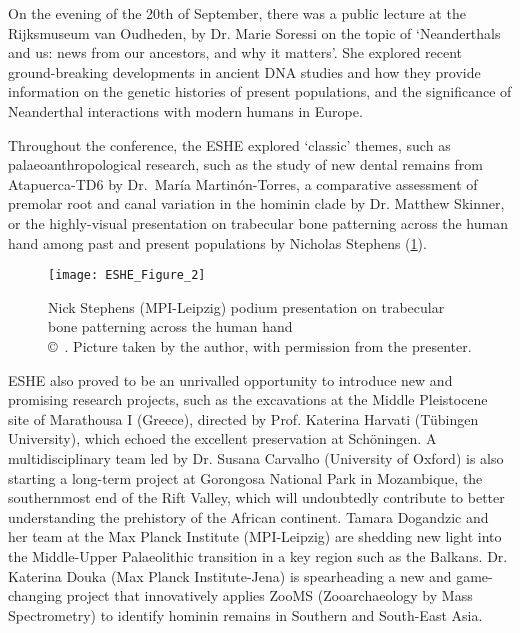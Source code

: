 On the evening of the 20th of September, there was a public lecture at the Rijksmuseum van Oudheden, by Dr. Marie Soressi on the topic of ‘Neanderthals and us: news from our ancestors, and why it matters’. She explored recent ground-breaking developments in ancient DNA studies and how they provide information on the genetic histories of present populations, and the significance of Neanderthal interactions with modern humans in Europe.

Throughout the conference, the ESHE explored ‘classic’ themes, such as palaeoanthropological research, such as the study of new dental remains from Atapuerca-TD6 by Dr.~María Martinón-Torres, a comparative assessment of premolar root and canal variation in the hominin clade by Dr. Matthew Skinner, or the highly-visual presentation on trabecular bone patterning across the human hand among past and present populations by Nicholas Stephens (\cref{fig:ESHE_Figure_2}).

\begin{figure}[!htb]
	\texttt{[image: ESHE\_Figure\_2]}
	\caption{Nick Stephens (MPI-Leipzig) podium presentation on trabecular bone patterning across the human hand
		{\normalfont\scriptsize \\ \copyright\
			\shortauthor. Picture taken by the author, with permission from the presenter.
	}}
	\label{fig:ESHE_Figure_2}
\end{figure}

ESHE also proved to be an unrivalled opportunity to introduce new and promising research projects, such as the excavations at the Middle Pleistocene site of Marathousa I (Greece), directed by Prof. Katerina Harvati (Tübingen University), which echoed the excellent preservation at Schöningen. A multidisciplinary team led by Dr. Susana Carvalho (University of Oxford) is also starting a long-term project at Gorongosa National Park in Mozambique, the southernmost end of the Rift Valley, which will undoubtedly contribute to better understanding the prehistory of the African continent. Tamara Dogandzic and her team at the Max Planck Institute (MPI-Leipzig) are shedding new light into the Middle-Upper Palaeolithic transition in a key region such as the Balkans. Dr. Katerina Douka (Max Planck Institute-Jena) is spearheading a new and game-changing project that innovatively applies ZooMS (Zooarchaeology by Mass Spectrometry) to identify hominin remains in Southern and South-East Asia.


